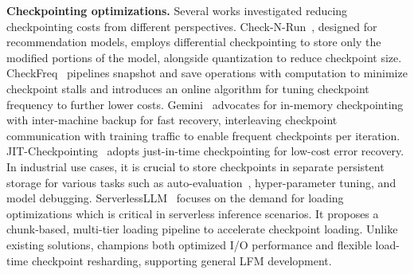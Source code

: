 \noindent \textbf{Checkpointing optimizations.} Several %
works \cite{projectadam, deepfreeze} %
 investigated reducing checkpointing costs from different perspectives.
Check-N-Run~\cite{check-n-run}, designed for recommendation models, employs differential checkpointing to store only the modified portions of the model, alongside quantization %
to reduce checkpoint size. %
CheckFreq~\cite{checkfreq} pipelines snapshot and save operations with computation to minimize checkpoint stalls and introduces an online algorithm for tuning checkpoint frequency to further lower costs. 
Gemini~\cite{gemini-sys} advocates for in-memory checkpointing with inter-machine backup for fast recovery, interleaving checkpoint communication with training traffic to enable frequent checkpoints per iteration.
JIT-Checkpointing~\cite{jit-check} adopts just-in-time checkpointing for low-cost error recovery.
In industrial use cases, it is crucial to store checkpoints in separate persistent storage for various tasks such as auto-evaluation~\cite{characterization}, hyper-parameter tuning, and model debugging.
ServerlessLLM~\cite{serverlessllm} focuses on the demand for loading optimizations which is critical in serverless inference scenarios.
It proposes a chunk-based, multi-tier loading pipeline to accelerate checkpoint loading.
Unlike existing solutions, \sys{} champions both optimized I/O performance and flexible load-time checkpoint resharding, supporting general LFM development.

